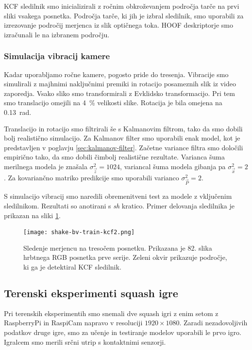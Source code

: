 KCF sledilnik smo inicializirali z ročnim obkroževanjem področja tarče na prvi sliki vsakega posnetka. Področja tarče, ki jih je izbral sledilnik, smo uporabili za izrezovanje področij merjenca iz slik optičnega toka. HOOF deskriptorje smo izračunali le na izbranem področju. 



\subsubsection{Simulacija vibracij kamere}
Kadar uporabljamo ročne kamere, pogosto pride do tresenja. Vibracije smo simulirali z majhnimi naključnimi premiki in rotacijo posameznih slik iz video zaporedja. Vsako sliko smo transformirali z Evklidsko transformacijo. Pri tem smo translacijo omejili na \SI{4}{\%} velikosti slike. Rotacija je bila omejena na \SI{0.13}{rad}. 

Translacijo in rotacijo smo filtrirali še s Kalmanovim filtrom, tako da smo dobili bolj realistično simulacijo. Za Kalmanov filter smo uporabili enak model, kot je predstavljen v poglavju \ref{sec:kalmanov-filter}. Začetne variance filtra smo določili empirično tako, da smo dobili čimbolj realistične rezultate. Varianca šuma merilnega modela je znašala $\sigma_\vec{z}^2=1024$, variancal šuma modela gibanja pa $\sigma_\vec{x}^2=2$. Za kovariančno matriko predikcije smo uporabili varianco $\sigma_\vec{P}^2=2$.

S simulacijo vibracij smo naredili obremenitveni test za modele z vključenim sledilnikom. Rezultati so anotirani s \textit{sh} kratico. Primer delovanja sledilnika je prikazan na sliki \ref{fig:vibracije}.

\begin{figure}[!htb]
	\centering
	\texttt{[image: shake-bv-train-kcf2.png]}
	\caption[Sledenje merjencu na tresočem posnetku]{Sledenje merjencu na tresočem posnetku. Prikazana je 82. slika hrbtnega RGB posnetka prve serije. Zeleni okvir prikazuje področje, ki ga je detektiral KCF sledilnik.}
	\label{fig:vibracije}
\end{figure} 








\subsection{Terenski eksperimenti squash igre}
Pri terenskih eksperimentih smo snemali dve squash igri z enim setom z RaspberryPi in RaspiCam napravo v resoluciji  $1920 \times 1080$. Zaradi nezadovoljivih podatkov druge igre, smo za učenje in testiranje modelov uporabili le prvo igro. Igralcem smo merili srčni utrip s kontaktnimi senzorji. 

